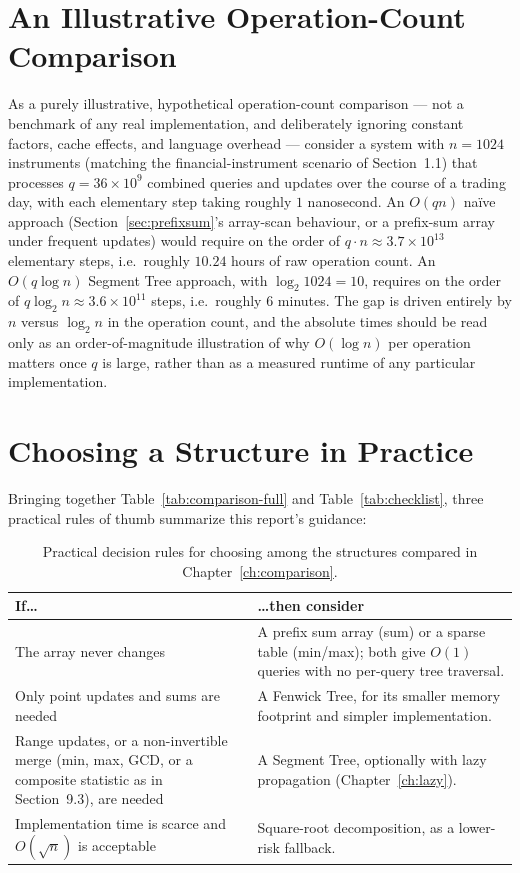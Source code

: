 \documentclass[
  11pt,
  a4paper,
  twoside=false,
  numbers=noenddot,
  headings=big,
  parskip=half,
  toc=bibliography,
  toc=listof,
  bibliography=totoc
]{scrreprt}
\newcommand{\Oh}[1]{O\!\left(#1\right)}
\newcommand{\tblhead}[1]{\textbf{\sffamily #1}}
\begin{document}
\section{An Illustrative Operation-Count Comparison}
As a purely illustrative, hypothetical operation-count comparison --- not a benchmark of any real implementation, and deliberately ignoring constant factors, cache effects, and language overhead --- consider a system with $n=1024$ instruments (matching the financial-instrument scenario of Section~1.1) that processes $q = 36\times 10^{9}$ combined queries and updates over the course of a trading day, with each elementary step taking roughly $1$ nanosecond. An $\Oh{qn}$ na\"ive approach (Section~\ref{sec:prefixsum}'s array-scan behaviour, or a prefix-sum array under frequent updates) would require on the order of $q\cdot n \approx 3.7\times 10^{13}$ elementary steps, i.e.\ roughly $10.24$ hours of raw operation count. An $\Oh{q\log n}$ Segment Tree approach, with $\log_2 1024 = 10$, requires on the order of $q\log_2 n \approx 3.6\times 10^{11}$ steps, i.e.\ roughly $6$ minutes. The gap is driven entirely by $n$ versus $\log_2 n$ in the operation count, and the absolute times should be read only as an order-of-magnitude illustration of why $\Oh{\log n}$ per operation matters once $q$ is large, rather than as a measured runtime of any particular implementation.

\section{Choosing a Structure in Practice}
Bringing together Table~\ref{tab:comparison-full} and Table~\ref{tab:checklist}, three practical rules of thumb summarize this report's guidance:

\begin{table}[H]
\centering
\caption{Practical decision rules for choosing among the structures compared in Chapter~\ref{ch:comparison}.}
\label{tab:decision-rules}
\begin{tabular}{>{\raggedright\arraybackslash}p{4.6cm}p{7.6cm}}
\toprule
\tblhead{If\ldots} & \tblhead{\ldots then consider} \\
\midrule
The array never changes & A prefix sum array (sum) or a sparse table (min/max); both give $\Oh{1}$ queries with no per-query tree traversal. \\
Only point updates and sums are needed & A Fenwick Tree, for its smaller memory footprint and simpler implementation. \\
Range updates, or a non-invertible merge (min, max, GCD, or a composite statistic as in Section~9.3), are needed & A Segment Tree, optionally with lazy propagation (Chapter~\ref{ch:lazy}). \\
Implementation time is scarce and $\Oh{\sqrt n}$ is acceptable & Square-root decomposition, as a lower-risk fallback. \\
\bottomrule
\end{tabular}
\end{table}
\end{document}
